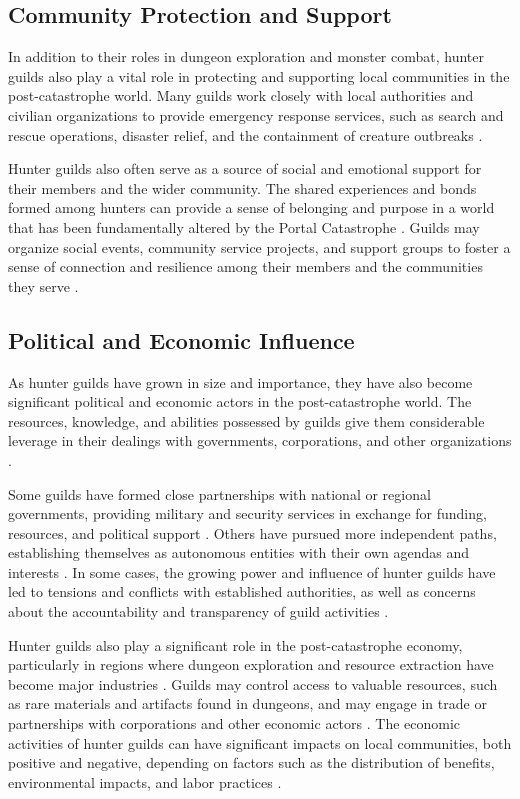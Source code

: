 \documentclass[12pt]{article}
\begin{document}
\subsection{Community Protection and Support}
In addition to their roles in dungeon exploration and monster combat, hunter guilds also play a vital role in protecting and supporting local communities in the post-catastrophe world. Many guilds work closely with local authorities and civilian organizations to provide emergency response services, such as search and rescue operations, disaster relief, and the containment of creature outbreaks \cite{Nguyen2026}.

Hunter guilds also often serve as a source of social and emotional support for their members and the wider community. The shared experiences and bonds formed among hunters can provide a sense of belonging and purpose in a world that has been fundamentally altered by the Portal Catastrophe \cite{Nakano2026}. Guilds may organize social events, community service projects, and support groups to foster a sense of connection and resilience among their members and the communities they serve \cite{Hofstede2027}.

\subsection{Political and Economic Influence}
As hunter guilds have grown in size and importance, they have also become significant political and economic actors in the post-catastrophe world. The resources, knowledge, and abilities possessed by guilds give them considerable leverage in their dealings with governments, corporations, and other organizations \cite{Nakamura2027}.

Some guilds have formed close partnerships with national or regional governments, providing military and security services in exchange for funding, resources, and political support \cite{Branson2027}. Others have pursued more independent paths, establishing themselves as autonomous entities with their own agendas and interests \cite{Seo2027}. In some cases, the growing power and influence of hunter guilds have led to tensions and conflicts with established authorities, as well as concerns about the accountability and transparency of guild activities \cite{Sokolov2026}.

Hunter guilds also play a significant role in the post-catastrophe economy, particularly in regions where dungeon exploration and resource extraction have become major industries \cite{Sakamoto2026}. Guilds may control access to valuable resources, such as rare materials and artifacts found in dungeons, and may engage in trade or partnerships with corporations and other economic actors \cite{Krasniqi2027}. The economic activities of hunter guilds can have significant impacts on local communities, both positive and negative, depending on factors such as the distribution of benefits, environmental impacts, and labor practices \cite{Fedorova2027}.
\end{document}
